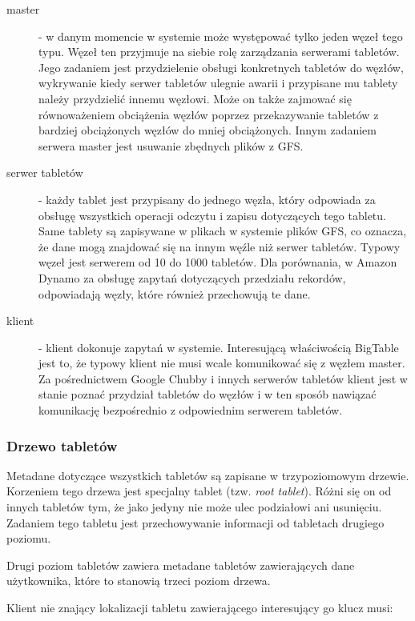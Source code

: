 \begin{description}
 \item[master] - w danym momencie w systemie może występować tylko jeden węzeł tego typu.
 Węzeł ten przyjmuje na siebie rolę zarządzania serwerami tabletów.
 Jego zadaniem jest przydzielenie obsługi konkretnych tabletów do węzłów, wykrywanie kiedy serwer tabletów ulegnie awarii i przypisane mu tablety należy przydzielić innemu węzłowi.
 Może on także zajmować się równoważeniem obciążenia węzłów poprzez przekazywanie tabletów z bardziej obciążonych węzłów do mniej obciążonych.
 Innym zadaniem serwera master jest usuwanie zbędnych plików z GFS. 
 \item[serwer tabletów] - każdy tablet jest przypisany do jednego węzła, który odpowiada za obsługę wszystkich operacji odczytu i zapisu dotyczących tego tabletu.
 Same tablety są zapisywane w plikach w systemie plików GFS, co oznacza, że dane mogą znajdować się na innym węźle niż serwer tabletów.
 Typowy węzeł jest serwerem od 10 do 1000 tabletów.
 Dla porównania, w Amazon Dynamo za obsługę zapytań dotyczących przedziału rekordów, odpowiadają węzły, które również przechowują te dane.
 \item[klient] - klient dokonuje zapytań w systemie.
 Interesującą właściwością BigTable jest to, że typowy klient nie musi wcale komunikować się z węzłem master.
 Za pośrednictwem Google Chubby i innych serwerów tabletów klient jest w stanie poznać przydział tabletów do węzłów i w ten sposób nawiązać komunikację bezpośrednio z odpowiednim serwerem tabletów.
\end{description}

\subsubsection*{Drzewo tabletów}


Metadane dotyczące wszystkich tabletów są zapisane w trzypoziomowym drzewie.
Korzeniem tego drzewa jest specjalny tablet (tzw. \emph{root tablet}).
Różni się on od innych tabletów tym, że jako jedyny nie może ulec podziałowi ani usunięciu.
Zadaniem tego tabletu jest przechowywanie informacji od tabletach drugiego poziomu.

Drugi poziom tabletów zawiera metadane tabletów zawierających dane użytkownika, które to stanowią trzeci poziom drzewa.

Klient nie znający lokalizacji tabletu zawierającego interesujący go klucz musi:

